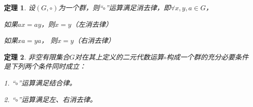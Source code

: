 \documentclass{article}
\newtheorem{Thm}{定理}
\begin{document}
\begin{CJK*}{UTF8}{gbsn}


\begin{Thm}
  设$(G,\circ)$为一个群，则“$\circ$”运算满足消去律，即$\forall x, y, a\in G$，

  如果$ax = ay$，则$x=y$（左消去律）

  如果$xa = ya$， 则$x=y$（右消去律）
\end{Thm}

\begin{Thm}
  非空有限集合$G$对在其上定义的二元代数运算$\circ$构成一个群的充分必要条件是下列两个条件同时成立：

  1. “$\circ$”运算满足结合律。

  2. “$\circ$”运算满足左、右消去律。
\end{Thm}





\end{CJK*}
\end{document}
